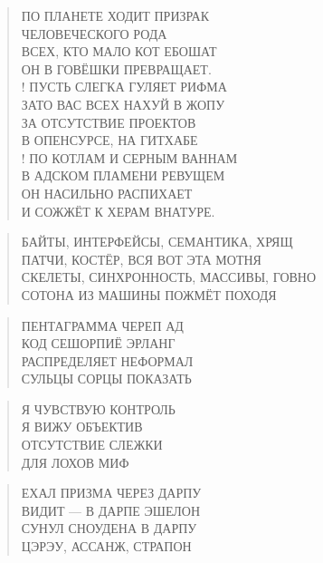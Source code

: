 \poemtitle{***}
\begin{verse}
ПО ПЛАНЕТЕ ХОДИТ ПРИЗРАК\\
ЧЕЛОВЕЧЕСКОГО РОДА\\
ВСЕХ, КТО МАЛО КОТ ЕБОШАТ\\
ОН В ГОВЁШКИ ПРЕВРАЩАЕТ.\\!
ПУСТЬ СЛЕГКА ГУЛЯЕТ РИФМА\\
ЗАТО ВАС ВСЕХ НАХУЙ В ЖОПУ\\
ЗА ОТСУТСТВИЕ ПРОЕКТОВ\\
В ОПЕНСУРСЕ, НА ГИТХАБЕ\\!
ПО КОТЛАМ И СЕРНЫМ ВАННАМ\\
В АДСКОМ ПЛАМЕНИ РЕВУЩЕМ\\
ОН НАСИЛЬНО РАСПИХАЕТ\\
И СОЖЖЁТ К ХЕРАМ ВНАТУРЕ.
\end{verse}

\poemtitle{***}
\begin{verse}
БАЙТЫ, ИНТЕРФЕЙСЫ, СЕМАНТИКА, ХРЯЩ\\
ПАТЧИ, КОСТЁР, ВСЯ ВОТ ЭТА МОТНЯ\\
СКЕЛЕТЫ, СИНХРОННОСТЬ, МАССИВЫ, ГОВНО\\
СОТОНА ИЗ МАШИНЫ ПОЖМЁТ ПОХОДЯ
\end{verse}

\poemtitle{***}
\begin{verse}
ПЕНТАГРАММА ЧЕРЕП АД\\
КОД СЕШОРПИЁ ЭРЛАНГ\\
РАСПРЕДЕЛЯЕТ НЕФОРМАЛ\\
СУЛЬЦЫ СОРЦЫ ПОКАЗАТЬ
\end{verse}

\poemtitle{***}
\begin{verse}
Я ЧУВСТВУЮ КОНТРОЛЬ\\
Я ВИЖУ ОБЪЕКТИВ\\
ОТСУТСТВИЕ СЛЕЖКИ\\
ДЛЯ ЛОХОВ МИФ
\end{verse}

\poemtitle{***}
\begin{verse}
ЕХАЛ ПРИЗМА ЧЕРЕЗ ДАРПУ\\
ВИДИТ — В ДАРПЕ ЭШЕЛОН\\
СУНУЛ СНОУДЕНА В ДАРПУ\\
ЦЭРЭУ, АССАНЖ, СТРАПОН
\end{verse}

